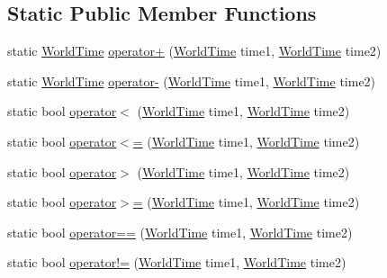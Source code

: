 \subsection*{Static Public Member Functions}
\begin{DoxyCompactItemize}
\item 
static \hyperlink{struct_world_time}{World\+Time} \hyperlink{struct_world_time_ae54958426ca27a976a6a462fa5a7d3d2}{operator+} (\hyperlink{struct_world_time}{World\+Time} time1, \hyperlink{struct_world_time}{World\+Time} time2)
\item 
static \hyperlink{struct_world_time}{World\+Time} \hyperlink{struct_world_time_a53dfaf2ff24a15d49a2b5e7f11325206}{operator-\/} (\hyperlink{struct_world_time}{World\+Time} time1, \hyperlink{struct_world_time}{World\+Time} time2)
\item 
static bool \hyperlink{struct_world_time_ab96005f93380c605d0c2aafba0b1691e}{operator$<$} (\hyperlink{struct_world_time}{World\+Time} time1, \hyperlink{struct_world_time}{World\+Time} time2)
\item 
static bool \hyperlink{struct_world_time_ab78a3eaa6f017c1e3c62528321ff47fd}{operator$<$=} (\hyperlink{struct_world_time}{World\+Time} time1, \hyperlink{struct_world_time}{World\+Time} time2)
\item 
static bool \hyperlink{struct_world_time_a6c47b1a280ee475b06f8c462a1b0b96f}{operator$>$} (\hyperlink{struct_world_time}{World\+Time} time1, \hyperlink{struct_world_time}{World\+Time} time2)
\item 
static bool \hyperlink{struct_world_time_ad6f54fcbc8e3fe7ccf845994362c6f18}{operator$>$=} (\hyperlink{struct_world_time}{World\+Time} time1, \hyperlink{struct_world_time}{World\+Time} time2)
\item 
static bool \hyperlink{struct_world_time_a037c1f58f3722a18e684a6120e8a6b3b}{operator==} (\hyperlink{struct_world_time}{World\+Time} time1, \hyperlink{struct_world_time}{World\+Time} time2)
\item 
static bool \hyperlink{struct_world_time_a0d96fe442fb0d3b9907b8c552d416a2a}{operator!=} (\hyperlink{struct_world_time}{World\+Time} time1, \hyperlink{struct_world_time}{World\+Time} time2)
\end{DoxyCompactItemize}
